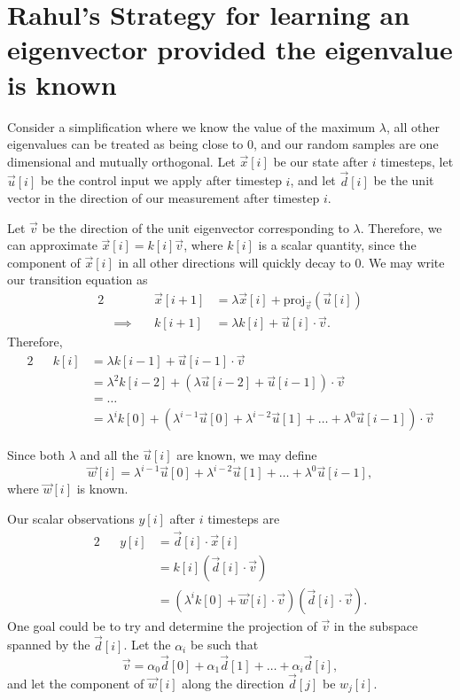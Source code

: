 \documentclass[letterpaper]{article}
\theoremstyle{remark}
\newcommand{\eqn}[1]{\begin{alignat*}{2}#1\end{alignat*}}
\newcommand*{\thus}{&\implies\quad&}
\begin{document}
\section*{Rahul's Strategy for learning an eigenvector provided the eigenvalue is known}
Consider a simplification where we know the value of the maximum $\lambda$, all other eigenvalues can be treated as being close to $0$, and our random samples are one dimensional and mutually orthogonal. Let $\vec{x}[i]$ be our state after $i$ timesteps, let $\vec{u}[i]$ be the control input we apply after timestep $i$, and let $\vec{d}[i]$ be the unit vector in the direction of our measurement after timestep $i$.

Let $\vec{v}$ be the direction of the unit eigenvector corresponding to $\lambda$. Therefore, we can approximate $\vec{x}[i] = k[i]\vec{v}$, where $k[i]$ is a scalar quantity, since the component of $\vec{x}[i]$ in all other directions will quickly decay to $0$. We may write our transition equation as
\eqn{
    && \vec{x}[i + 1] &= \lambda \vec{x}[i] + \text{proj}_{\vec{v}}(\vec{u}[i]) \\
    \thus k[i + 1] &= \lambda k[i] + \vec{u}[i] \cdot \vec{v}.
}
Therefore,
\eqn{
    && k[i] &= \lambda k[i - 1] + \vec{u}[i - 1] \cdot \vec{v} \\
    &&&= \lambda^2 k[i-2] + (\lambda \vec{u}[i - 2] + \vec{u}[i - 1])\cdot \vec{v} \\
    &&&= \ldots \\
    &&&= \lambda^i k[0] + (\lambda^{i - 1} \vec{u}[0] + \lambda^{i - 2} \vec{u}[1] + \ldots + \lambda^0\vec{u}[i - 1])\cdot \vec{v}
}

Since both $\lambda$ and all the $\vec{u}[i]$ are known, we may define
\[
    \vec{w}[i] = \lambda^{i - 1} \vec{u}[0] + \lambda^{i - 2} \vec{u}[1] + \ldots + \lambda^0\vec{u}[i - 1],
\]
where $\vec{w}[i]$ is known.

Our scalar observations $y[i]$ after $i$ timesteps are
\eqn{
    && y[i] &= \vec{d}[i] \cdot \vec{x}[i] \\
    &&&= k[i] (\vec{d}[i]\cdot\vec{v}) \\
    &&&= (\lambda^i k[0] + \vec{w}[i] \cdot \vec{v})(\vec{d}[i] \cdot \vec{v}).
}
One goal could be to try and determine the projection of $\vec{v}$ in the subspace spanned by the $\vec{d}[i]$. Let the $\alpha_i$ be such that
\[
    \vec{v} = \alpha_0\vec{d}[0] + \alpha_1\vec{d}[1] + \ldots + \alpha_i\vec{d}[i],
\]
and let the component of $\vec{w}[i]$ along the direction $\vec{d}[j]$ be ${w}_j[i]$.
\end{document}
